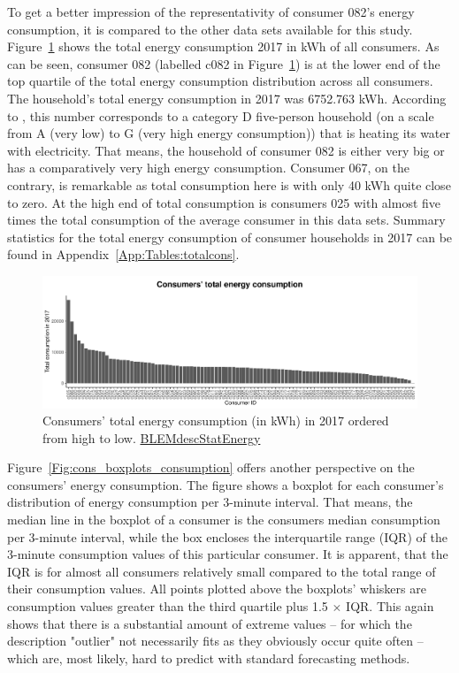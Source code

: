 To get a better impression of the representativity of consumer 082's energy consumption, it is compared to the other data sets available for this study. Figure~\ref{Fig:cons_total_consumption} shows the total energy consumption 2017 in kWh of all consumers. As can be seen, consumer 082 (labelled c082 in Figure~\ref{Fig:cons_total_consumption}) is at the lower end of the top quartile of the total energy consumption distribution across all consumers. The household's total energy consumption in 2017 was 6752.763 kWh. According to \citet{Stromspiegel:2017}, this number corresponds to a category D five-person household (on a scale from A (very low) to G (very high energy consumption)) that is heating its water with electricity. That means, the household of consumer 082 is either very big or has a comparatively very high energy consumption. Consumer 067, on the contrary, is remarkable as total consumption here is with only 40 kWh quite close to zero. At the high end of total consumption is consumers 025 with almost five times the total consumption of the average consumer in this data sets. Summary statistics for the total energy consumption of consumer households in 2017 can be found in Appendix~\ref{App:Tables:totalcons}.

\begin{figure}[htbp]
 \centering
\includegraphics[width=\textwidth]{thesis/graphs/consumer_totalconsumption2.pdf}
\caption[Consumers' total energy consumption (in kWh) in 2017]{Consumers' total energy consumption (in kWh) in 2017 ordered from high to low. \quantnet\href{ }{BLEMdescStatEnergy}}
\label{Fig:cons_total_consumption}
\end{figure}

Figure~\ref{Fig:cons_boxplots_consumption} offers another perspective on the consumers' energy consumption. The figure shows a boxplot for each consumer's distribution of energy consumption per 3-minute interval. That means, the median line in the boxplot of a consumer is the consumers median consumption per 3-minute interval, while the box encloses the interquartile range (IQR) of the 3-minute consumption values of this particular consumer. It is apparent, that the IQR is for almost all consumers relatively small compared to the total range of their consumption values. All points plotted above the boxplots' whiskers are consumption values greater than the third quartile plus 1.5 $\times$ IQR. This again shows that there is a substantial amount of extreme values -- for which the description "outlier" not necessarily fits as they obviously occur quite often -- which are, most likely, hard to predict with standard forecasting methods.

